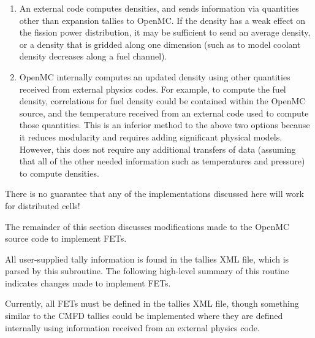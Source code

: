 \documentclass[10pt]{article}
\newcounter{subsubsubsection}[subsubsection]
\numberwithin{equation}{section} %
\begin{document}
\begin{itemize}
\begin{enumerate}
	\item An external code computes densities, and sends information via quantities other than expansion tallies to OpenMC. If the density has a weak effect on the fission power distribution, it may be sufficient to send an average density, or a density that is gridded along one dimension (such as to model coolant density decreases along a fuel channel).
	\item OpenMC internally computes an updated density using other quantities received from external physics codes. For example, to compute the fuel density, correlations for fuel density could be contained within the OpenMC source, and the temperature received from an external code used to compute those quantities. This is an inferior method to the above two options because it reduces modularity and requires adding significant physical models. However, this does not require any additional transfers of data (assuming that all of the other needed information such as temperatures and pressure) to compute densities.
	\end{enumerate}
\end{itemize}

\color{magenta}
There is no guarantee that any of the implementations discussed here will work for distributed cells!
\color{black}

The remainder of this section discusses modifications made to the OpenMC source code to implement FETs.

All user-supplied tally information is found in the tallies XML file, which is parsed by this subroutine. The following high-level summary of this routine indicates changes made to implement FETs.

\color{magenta}
Currently, all FETs must be defined in the tallies XML file, though something similar to the CMFD tallies could be implemented where they are defined internally using information received from an external physics code.
\color{black}
\end{document}
